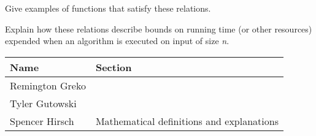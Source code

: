 \documentclass{article}
\begin{document}
\noindent Give examples of functions that satisfy these relations.

\medskip

\noindent Explain how these relations describe bounds on running time (or other resources)
expended when an algorithm is executed on input of size \textit{n}.

\pagebreak

\begin{center}
    \begin{tabular}{|p{3cm}|p{6cm}|}
        \hline
        \textbf{Name} & \textbf{Section} \\
        \hline
        Remington Greko &  \\
        \hline
        Tyler Gutowski &  \\
        \hline
        Spencer Hirsch & Mathematical definitions and explanations \\
        \hline
    \end{tabular}
\end{center}
\end{document}
